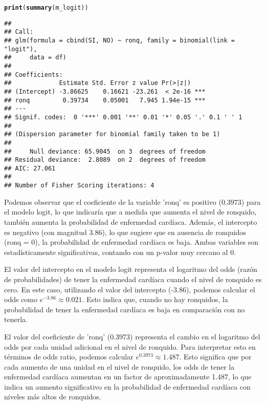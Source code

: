 \documentclass[paper=letter, fontsize=11pt, draft=false]{scrartcl}\usepackage[]{graphicx}\usepackage[]{xcolor}
\makeatletter
\newcommand{\hldef}[1]{\textcolor[rgb]{0.345,0.345,0.345}{#1}}%
\newcommand{\hlkwd}[1]{\textcolor[rgb]{0.737,0.353,0.396}{\textbf{#1}}}%
\newenvironment{kframe}{%
 \def\at@end@of@kframe{}%
 \ifinner\ifhmode%
  \def\at@end@of@kframe{\end{minipage}}%
  \begin{minipage}{\columnwidth}%
 \fi\fi%
 \def\FrameCommand##1{\hskip\@totalleftmargin \hskip-\fboxsep
 \colorbox{shadecolor}{##1}\hskip-\fboxsep
     \hskip-\linewidth \hskip-\@totalleftmargin \hskip\columnwidth}%
 \MakeFramed {\advance\hsize-\width
   \@totalleftmargin\z@ \linewidth\hsize
   \@setminipage}}%
 {\par\unskip\endMakeFramed%
 \at@end@of@kframe}
\newenvironment{knitrout}{}{} %
\numberwithin{equation}{problemcounter} %
\numberwithin{figure}{problemcounter} %
\numberwithin{table}{problemcounter} %
\numberwithin{subsection}{problemcounter}
\makeatother
\begin{document}
\begin{knitrout}
\color{fgcolor}\begin{kframe}
\begin{alltt}
\hlkwd{print}\hldef{(}\hlkwd{summary}\hldef{(m_logit))}
\end{alltt}
\begin{verbatim}
## 
## Call:
## glm(formula = cbind(SI, NO) ~ ronq, family = binomial(link = "logit"), 
##     data = df)
## 
## Coefficients:
##             Estimate Std. Error z value Pr(>|z|)    
## (Intercept) -3.86625    0.16621 -23.261  < 2e-16 ***
## ronq         0.39734    0.05001   7.945 1.94e-15 ***
## ---
## Signif. codes:  0 '***' 0.001 '**' 0.01 '*' 0.05 '.' 0.1 ' ' 1
## 
## (Dispersion parameter for binomial family taken to be 1)
## 
##     Null deviance: 65.9045  on 3  degrees of freedom
## Residual deviance:  2.8089  on 2  degrees of freedom
## AIC: 27.061
## 
## Number of Fisher Scoring iterations: 4
\end{verbatim}
\end{kframe}
\end{knitrout}

Podemos observar que el coeficiente de la variable 'ronq' es positivo (0.3973) para el modelo logit, lo que indicaría que a medida que aumenta el nivel de ronquido, también aumenta la probabilidad de enfermedad cardíaca. Además, el intercepto es negativo (con magnitud 3.86), lo que sugiere que en ausencia de ronquidos (ronq = 0), la probabilidad de enfermedad cardíaca es baja. Ambas variables son estadísticamente significativas, contando con un p-valor muy cercano al 0.

El valor del intercepto en el modelo logit representa el logaritmo del odds (razón de probabilidades) de tener la enfermedad cardíaca cuando el nivel de ronquido es cero. En este caso, utilizando el valor del intercepto (-3.86), podemos calcular el odds como \(e^{-3.86} \approx 0.021\). Esto indica que, cuando no hay ronquidos, la probabilidad de tener la enfermedad cardíaca es baja en comparación con no tenerla.

El valor del coeficiente de 'ronq' (0.3973) representa el cambio en el logaritmo del odds por cada unidad adicional en el nivel de ronquido. Para interpretar esto en términos de odds ratio, podemos calcular \(e^{0.3973} \approx 1.487\). Esto significa que por cada aumento de una unidad en el nivel de ronquido, los odds de tener la enfermedad cardíaca aumentan en un factor de aproximadamente 1.487, lo que indica un aumento significativo en la probabilidad de enfermedad cardíaca con niveles más altos de ronquidos.
\end{document}
